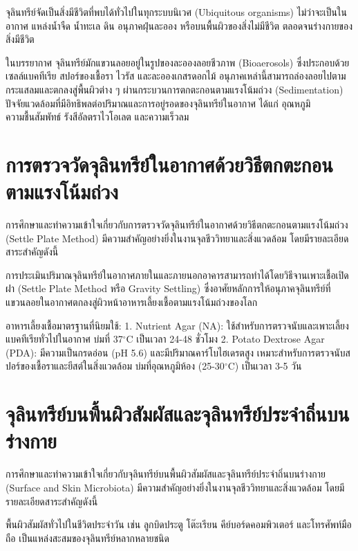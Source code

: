 จุลินทรีย์จัดเป็นสิ่งมีชีวิตที่พบได้ทั่วไปในทุกระบบนิเวศ (Ubiquitous organisms) ไม่ว่าจะเป็นในอากาศ แหล่งน้ำจืด น้ำทะเล ดิน อนุภาคฝุ่นละออง หรือบนพื้นผิวของสิ่งไม่มีชีวิต ตลอดจนร่างกายของสิ่งมีชีวิต

ในบรรยากาศ จุลินทรีย์มักแขวนลอยอยู่ในรูปของละอองลอยชีวภาพ (Bioaerosols) ซึ่งประกอบด้วยเซลล์แบคทีเรีย สปอร์ของเชื้อรา ไวรัส และละอองเกสรดอกไม้ อนุภาคเหล่านี้สามารถล่องลอยไปตามกระแสลมและตกลงสู่พื้นผิวต่าง ๆ ผ่านกระบวนการตกตะกอนตามแรงโน้มถ่วง (Sedimentation) ปัจจัยแวดล้อมที่มีอิทธิพลต่อปริมาณและการอยู่รอดของจุลินทรีย์ในอากาศ ได้แก่ อุณหภูมิ ความชื้นสัมพัทธ์ รังสีอัลตราไวโอเลต และความเร็วลม

\section{การตรวจวัดจุลินทรีย์ในอากาศด้วยวิธีตกตะกอนตามแรงโน้มถ่วง}

การศึกษาและทำความเข้าใจเกี่ยวกับการตรวจวัดจุลินทรีย์ในอากาศด้วยวิธีตกตะกอนตามแรงโน้มถ่วง (Settle Plate Method) มีความสำคัญอย่างยิ่งในงานจุลชีววิทยาและสิ่งแวดล้อม โดยมีรายละเอียดสาระสำคัญดังนี้

การประเมินปริมาณจุลินทรีย์ในอากาศภายในและภายนอกอาคารสามารถทำได้โดยวิธีจานเพาะเชื้อเปิดฝา (Settle Plate Method หรือ Gravity Settling) ซึ่งอาศัยหลักการให้อนุภาคจุลินทรีย์ที่แขวนลอยในอากาศตกลงสู่ผิวหน้าอาหารเลี้ยงเชื้อตามแรงโน้มถ่วงของโลก

อาหารเลี้ยงเชื้อมาตรฐานที่นิยมใช้:
1. Nutrient Agar (NA): ใช้สำหรับการตรวจนับและเพาะเลี้ยงแบคทีเรียทั่วไปในอากาศ บ่มที่ 37$^{\circ}$C เป็นเวลา 24-48 ชั่วโมง
2. Potato Dextrose Agar (PDA): มีความเป็นกรดอ่อน (pH 5.6) และมีปริมาณคาร์โบไฮเดรตสูง เหมาะสำหรับการตรวจนับสปอร์ของเชื้อราและยีสต์ในสิ่งแวดล้อม บ่มที่อุณหภูมิห้อง (25-30$^{\circ}$C) เป็นเวลา 3-5 วัน

\section{จุลินทรีย์บนพื้นผิวสัมผัสและจุลินทรีย์ประจำถิ่นบนร่างกาย}

การศึกษาและทำความเข้าใจเกี่ยวกับจุลินทรีย์บนพื้นผิวสัมผัสและจุลินทรีย์ประจำถิ่นบนร่างกาย (Surface and Skin Microbiota) มีความสำคัญอย่างยิ่งในงานจุลชีววิทยาและสิ่งแวดล้อม โดยมีรายละเอียดสาระสำคัญดังนี้

พื้นผิวสัมผัสทั่วไปในชีวิตประจำวัน เช่น ลูกบิดประตู โต๊ะเรียน คีย์บอร์ดคอมพิวเตอร์ และโทรศัพท์มือถือ เป็นแหล่งสะสมของจุลินทรีย์หลากหลายชนิด

